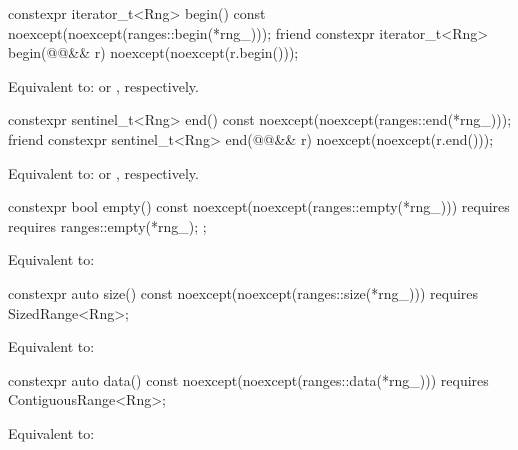 {%
\begin{itemdecl}
constexpr iterator_t<Rng> begin() const
  noexcept(noexcept(ranges::begin(*rng_)));
friend constexpr iterator_t<Rng> begin(@@&& r)
  noexcept(noexcept(r.begin()));
\end{itemdecl}

\begin{itemdescr}
\pnum
\effects Equivalent to: 
or , respectively.
\end{itemdescr}

%
\begin{itemdecl}
constexpr sentinel_t<Rng> end() const
  noexcept(noexcept(ranges::end(*rng_)));
friend constexpr sentinel_t<Rng> end(@@&& r)
  noexcept(noexcept(r.end()));
\end{itemdecl}

\begin{itemdescr}
\pnum
\effects Equivalent to: 
or , respectively.
\end{itemdescr}

%
\begin{itemdecl}
constexpr bool empty() const
  noexcept(noexcept(ranges::empty(*rng_)))
  requires requires { ranges::empty(*rng_); };
\end{itemdecl}

\begin{itemdescr}
\pnum
\effects Equivalent to: 
\end{itemdescr}

%
\begin{itemdecl}
constexpr auto size() const
  noexcept(noexcept(ranges::size(*rng_)))
  requires SizedRange<Rng>;
\end{itemdecl}

\begin{itemdescr}
\pnum
\effects Equivalent to: 
\end{itemdescr}

%
\begin{itemdecl}
constexpr auto data() const
  noexcept(noexcept(ranges::data(*rng_)))
  requires ContiguousRange<Rng>;
\end{itemdecl}

\begin{itemdescr}
\pnum
\effects Equivalent to: 
\end{itemdescr}
} %

